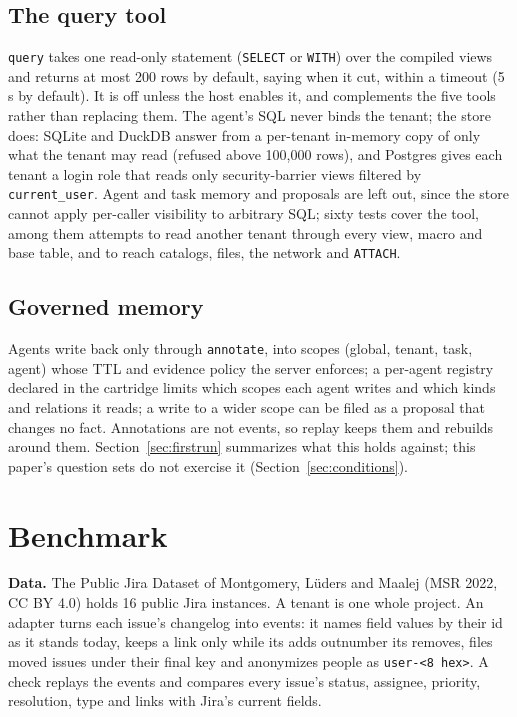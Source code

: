 \documentclass[sigconf, nonacm]{acmart}
\newcommand{\code}[1]{\texttt{#1}}
\begin{document}
\subsection{The query tool}
\label{sec:query}

\code{query} takes one read-only statement (\code{SELECT} or \code{WITH}) over the compiled views and returns at most 200 rows by default, saying when it cut, within a timeout (5 s by default). It is off unless the host enables it, and complements the five tools rather than replacing them. The agent's SQL never binds the tenant; the store does: SQLite and DuckDB answer from a per-tenant in-memory copy of only what the tenant may read (refused above 100,000 rows), and Postgres gives each tenant a login role that reads only security-barrier views filtered by \code{current\_user}. Agent and task memory and proposals are left out, since the store cannot apply per-caller visibility to arbitrary SQL; sixty tests cover the tool, among them attempts to read another tenant through every view, macro and base table, and to reach catalogs, files, the network and \code{ATTACH}.

\subsection{Governed memory}
\label{sec:memory-gov}

Agents write back only through \code{annotate}, into scopes (global, tenant, task, agent) whose TTL and evidence policy the server enforces; a per-agent registry declared in the cartridge limits which scopes each agent writes and which kinds and relations it reads; a write to a wider scope can be filed as a proposal that changes no fact. Annotations are not events, so replay keeps them and rebuilds around them. Section~\ref{sec:firstrun} summarizes what this holds against; this paper's question sets do not exercise it (Section~\ref{sec:conditions}).

\section{Benchmark}
\label{sec:benchmark}

\textbf{Data.} The Public Jira Dataset of Montgomery, Lüders and Maalej \cite{jira} (MSR 2022, CC BY 4.0) holds 16 public Jira instances. A tenant is one whole project. An adapter turns each issue's changelog into events: it names field values by their id as it stands today, keeps a link only while its adds outnumber its removes, files moved issues under their final key and anonymizes people as \code{user-<8 hex>}. A check replays the events and compares every issue's status, assignee, priority, resolution, type and links with Jira's current fields.
\end{document}

